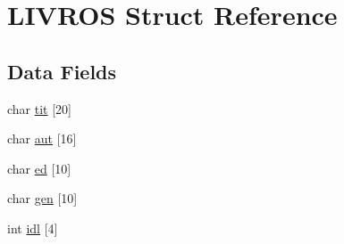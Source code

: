 \hypertarget{struct_l_i_v_r_o_s}{\section{L\+I\+V\+R\+O\+S Struct Reference}
\label{struct_l_i_v_r_o_s}
}
\subsection*{Data Fields}
\begin{DoxyCompactItemize}
\item 
char \hyperlink{struct_l_i_v_r_o_s_ab8164aa01854c06df11e1e1f22d32f22}{tit} \mbox{[}20\mbox{]}
\item 
char \hyperlink{struct_l_i_v_r_o_s_a5273ad9b6cc5de9aa63db51e74d2e950}{aut} \mbox{[}16\mbox{]}
\item 
char \hyperlink{struct_l_i_v_r_o_s_a7343f3b439e393d55096dfa02214fd4a}{ed} \mbox{[}10\mbox{]}
\item 
char \hyperlink{struct_l_i_v_r_o_s_a81b3cc6450c77481974037c3222cb9ff}{gen} \mbox{[}10\mbox{]}
\item 
int \hyperlink{struct_l_i_v_r_o_s_ac9639d5d4181be687dc6d15def280e26}{idl} \mbox{[}4\mbox{]}
\end{DoxyCompactItemize}


